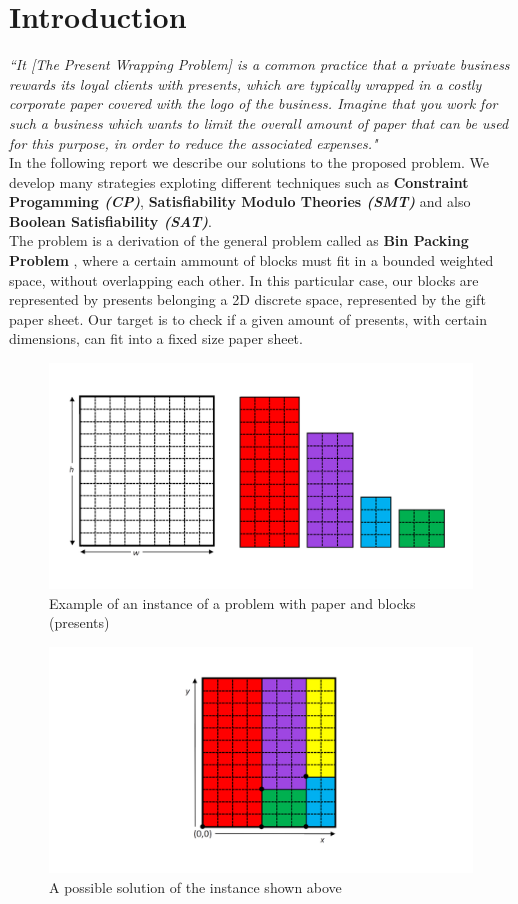 \chapter{Introduction}
\textit{
    ``It [The Present Wrapping Problem] is a common practice that a private business rewards its loyal clients with presents, which are typically wrapped in a costly
    corporate paper covered with the logo of the business. Imagine that you work for such a business which wants to limit the overall amount of paper that can be used for this purpose,
    in order to reduce the associated expenses." \cite{project}
}
\\

In the following report we describe our solutions to the proposed problem.
We develop many strategies exploting different techniques such as \textbf{Constraint Progamming \textit{(CP)}},
\textbf{Satisfiability Modulo Theories \textit{(SMT)}} and also \textbf{Boolean Satisfiability \textit{(SAT)}}.
\\
The problem is a derivation of the general problem called as \textbf{Bin Packing Problem} \cite{binpack}, where a certain ammount of blocks must fit
in a bounded weighted space, without overlapping each other.
In this particular case, our blocks are represented by presents belonging a 2D discrete space, represented by the gift paper sheet.
Our target is to check if a given amount of presents, with certain dimensions, can fit into a fixed size paper sheet. 

\begin{figure}
	\centering
	\includegraphics[width=\textwidth]{images/input_problem.png}
	\caption{Example of an instance of a problem with paper and blocks (presents)}
	\label{fig:overlaps}
\end{figure}

\begin{figure}
	\centering
	\includegraphics[width=\textwidth]{images/solved_problem.png}
	\caption{A possible solution of the instance shown above}
	\label{fig:overlaps}
\end{figure}
